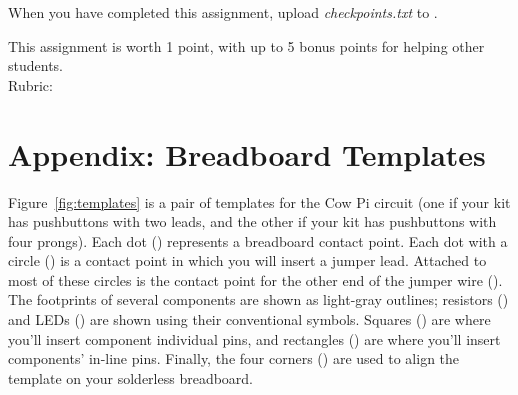     When you have completed this assignment, upload \textit{checkpoints.txt} to \filesubmission.

    This assignment is worth 1 point, with up to 5 bonus points for helping other students. \\

    Rubric:
    \begin{description}
    \end{description}

\section*{Appendix: Breadboard Templates}

    Figure~\ref{fig:templates} is a pair of templates for the Cow Pi circuit (one if your kit has pushbuttons with two leads, and the other if your kit has pushbuttons with four prongs).
    Each dot () represents a breadboard contact point.
    Each dot with a circle () is a contact point in which you will insert a jumper lead.
    Attached to most of these circles is the contact point for the other end of the jumper wire ().
    The footprints of several components are shown as light-gray outlines;
    resistors () and LEDs () are shown using their conventional symbols.
    Squares () are where you'll insert component individual pins,
        and rectangles () are where you'll insert components' in-line pins.
    Finally, the four corners () are used to align the template on your solderless breadboard.

